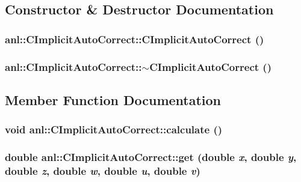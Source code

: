 \subsection{Constructor \& Destructor Documentation}
\hypertarget{classanl_1_1CImplicitAutoCorrect_a418adcdccf2ebffb4a304328addbe04d}{
\subsubsection[{CImplicitAutoCorrect}]{\setlength{\rightskip}{0pt plus 5cm}anl::CImplicitAutoCorrect::CImplicitAutoCorrect ()}}
\label{classanl_1_1CImplicitAutoCorrect_a418adcdccf2ebffb4a304328addbe04d}
\hypertarget{classanl_1_1CImplicitAutoCorrect_a5411875e21e8d910120faf0252a0e8b0}{
\subsubsection[{$\sim$CImplicitAutoCorrect}]{\setlength{\rightskip}{0pt plus 5cm}anl::CImplicitAutoCorrect::$\sim$CImplicitAutoCorrect ()}}
\label{classanl_1_1CImplicitAutoCorrect_a5411875e21e8d910120faf0252a0e8b0}


\subsection{Member Function Documentation}
\hypertarget{classanl_1_1CImplicitAutoCorrect_ab76cb5d3a15d1e189e0604969c7811b4}{
\subsubsection[{calculate}]{\setlength{\rightskip}{0pt plus 5cm}void anl::CImplicitAutoCorrect::calculate ()}}
\label{classanl_1_1CImplicitAutoCorrect_ab76cb5d3a15d1e189e0604969c7811b4}
\hypertarget{classanl_1_1CImplicitAutoCorrect_ade9981b74d7798d6ad2840f57c191d45}{
\subsubsection[{get}]{\setlength{\rightskip}{0pt plus 5cm}double anl::CImplicitAutoCorrect::get (double {\em x}, \/  double {\em y}, \/  double {\em z}, \/  double {\em w}, \/  double {\em u}, \/  double {\em v})}}
\label{classanl_1_1CImplicitAutoCorrect_ade9981b74d7798d6ad2840f57c191d45}


